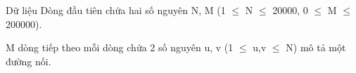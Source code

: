 Dữ liệu
Dòng đầu tiên chứa hai số nguyên N, M (1  $\le$  N  $\le$  20000, 0  $\le$  M  $\le$  200000).

M dòng tiếp theo mỗi dòng chứa 2 số nguyên u, v (1 $\le$ u,v  $\le$ N) mô tả một đường nối.